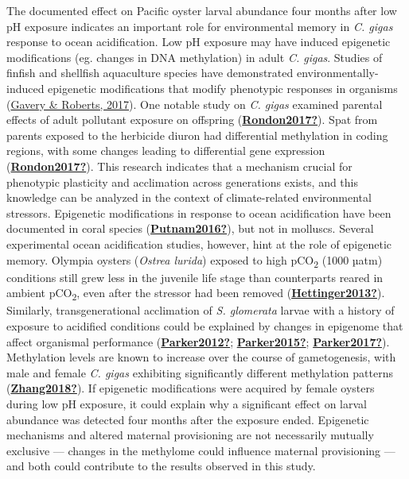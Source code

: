 \documentclass [11pt, proquest] {uwthesis}[2015/03/03]
\begin{document}
The documented effect on Pacific oyster larval abundance four months after low pH exposure indicates an important role for environmental memory in \emph{C. gigas} response to ocean acidification. Low pH exposure may have induced epigenetic modifications (eg. changes in DNA methylation) in adult \emph{C. gigas}. Studies of finfish and shellfish aquaculture species have demonstrated environmentally-induced epigenetic modifications that modify phenotypic responses in organisms (\protect\hyperlink{ref-Gavery2017}{Gavery \& Roberts, 2017}). One notable study on \emph{C. gigas} examined parental effects of adult pollutant exposure on offspring (\protect\hyperlink{ref-Rondon2017}{\textbf{Rondon2017?}}). Spat from parents exposed to the herbicide diuron had differential methylation in coding regions, with some changes leading to differential gene expression (\protect\hyperlink{ref-Rondon2017}{\textbf{Rondon2017?}}). This research indicates that a mechanism crucial for phenotypic plasticity and acclimation across generations exists, and this knowledge can be analyzed in the context of climate-related environmental stressors. Epigenetic modifications in response to ocean acidification have been documented in coral species (\protect\hyperlink{ref-Putnam2016}{\textbf{Putnam2016?}}), but not in molluscs. Several experimental ocean acidification studies, however, hint at the role of epigenetic memory. Olympia oysters (\emph{Ostrea lurida}) exposed to high pCO\textsubscript{2} (1000 µatm) conditions still grew less in the juvenile life stage than counterparts reared in ambient pCO\textsubscript{2}, even after the stressor had been removed (\protect\hyperlink{ref-Hettinger2013}{\textbf{Hettinger2013?}}). Similarly, transgenerational acclimation of \emph{S. glomerata} larvae with a history of exposure to acidified conditions could be explained by changes in epigenome that affect organismal performance (\protect\hyperlink{ref-Parker2012}{\textbf{Parker2012?}}; \protect\hyperlink{ref-Parker2015}{\textbf{Parker2015?}}; \protect\hyperlink{ref-Parker2017}{\textbf{Parker2017?}}). Methylation levels are known to increase over the course of gametogenesis, with male and female \emph{C. gigas} exhibiting significantly different methylation patterns (\protect\hyperlink{ref-Zhang2018}{\textbf{Zhang2018?}}). If epigenetic modifications were acquired by female oysters during low pH exposure, it could explain why a significant effect on larval abundance was detected four months after the exposure ended. Epigenetic mechanisms and altered maternal provisioning are not necessarily mutually exclusive --- changes in the methylome could influence maternal provisioning --- and both could contribute to the results observed in this study.
\end{document}
